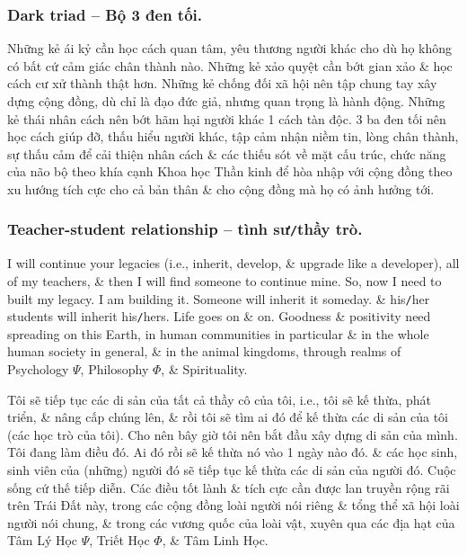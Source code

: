 \documentclass[12pt,twoside]{book}
\begin{document}
\subsubsection*{Dark triad -- Bộ 3 đen tối.} Những kẻ ái kỷ cần học cách quan tâm, yêu thương người khác cho dù họ không có bất cứ cảm giác chân thành nào. Những kẻ xảo quyệt cần bớt gian xảo \& học cách cư xử thành thật hơn. Những kẻ chống đối xã hội nên tập chung tay xây dựng cộng đồng, dù chỉ là đạo đức giả, nhưng quan trọng là hành động. Những kẻ thái nhân cách nên bớt hãm hại người khác 1 cách tàn độc. 3 ba đen tối nên học cách giúp đỡ, thấu hiểu người khác, tập cảm nhận niềm tin, lòng chân thành, sự thấu cảm để cải thiện nhân cách \& các thiếu sót về mặt cấu trúc, chức năng của não bộ theo khía cạnh Khoa học Thần kinh để hòa nhập với cộng đồng theo xu hướng tích cực cho cả bản thân \& cho cộng đồng mà họ có ảnh hưởng tới.

\subsubsection*{Teacher-student relationship -- tình sư{\tt/}thầy trò.} I will continue your legacies (i.e., inherit, develop, \& upgrade like a developer), all of my teachers, \& then I will find someone to continue mine. So, now I need to built my legacy. I am building it. Someone will inherit it someday. \& his{\tt/}her students will inherit his{\tt/}hers. Life goes on \& on. Goodness \& positivity need spreading on this Earth, in human communities in particular \& in the whole human society in general, \& in the animal kingdoms, through realms of Psychology $\Psi$, Philosophy $\Phi$, \& Spirituality.

Tôi sẽ tiếp tục các di sản của tất cả thầy cô của tôi, i.e., tôi sẽ kế thừa, phát triển, \& nâng cấp chúng lên, \& rồi tôi sẽ tìm ai đó để kế thừa các di sản của tôi (các học trò của tôi). Cho nên bây giờ tôi nên bắt đầu xây dựng di sản của mình. Tôi đang làm điều đó. Ai đó rồi sẽ kế thừa nó vào 1 ngày nào đó. \& các học sinh, sinh viên của (những) người đó sẽ tiếp tục kế thừa các di sản của người đó. Cuộc sống cứ thế tiếp diễn. Các điều tốt lành \& tích cực cần được lan truyền rộng rãi trên Trái Đất này, trong các cộng đồng loài người nói riêng \& tổng thể xã hội loài người nói chung, \& trong các vương quốc của loài vật, xuyên qua các địa hạt của Tâm Lý Học $\Psi$, Triết Học $\Phi$, \& Tâm Linh Học.

\end{document}
